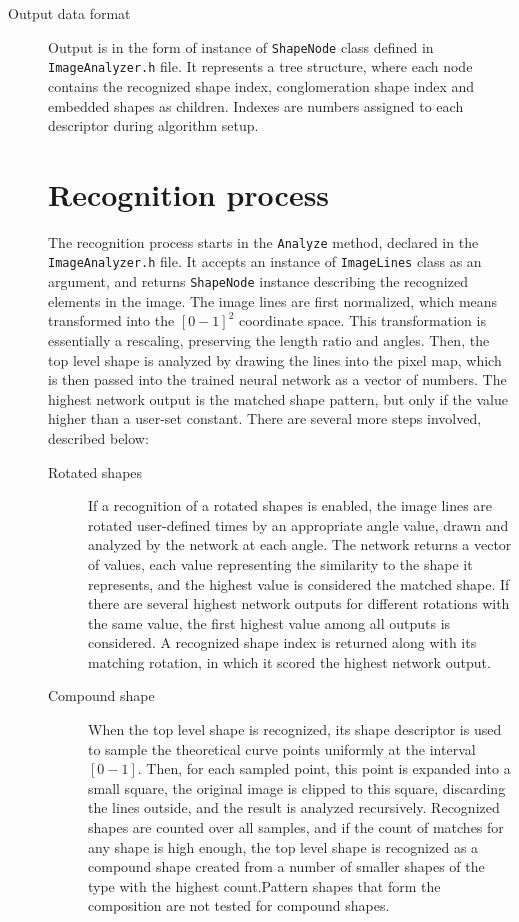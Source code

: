 \begin{description}
\item [Output data format]
Output is in the form of instance of \texttt{ShapeNode} class defined in \texttt{ImageAnalyzer.h} file. It represents a tree structure, where each node contains the recognized shape index, conglomeration shape index and embedded shapes as children. Indexes are numbers assigned to each descriptor during algorithm setup.


\section{Recognition process}
The recognition process starts in the \texttt{Analyze} method, declared in the \texttt{ImageAnalyzer.h} file. It accepts an instance of \texttt{ImageLines} class as an argument, and returns \texttt{ShapeNode} instance describing the recognized elements in the image. The image lines are first normalized, which means transformed into the $[0-1]^2$ coordinate space. This transformation is essentially a rescaling, preserving the length ratio and angles. Then, the top level shape is analyzed by drawing the lines into the pixel map, which is then passed into the trained neural network as a vector of numbers. The highest network output is the matched shape pattern, but only if the value higher than a user-set constant. There are several more steps involved, described below:

\begin{description}
\item [Rotated shapes] If a recognition of a rotated shapes is enabled, the image lines are rotated user-defined times by an appropriate angle value, drawn and analyzed by the network at each angle. The network returns a vector of values, each value representing the similarity to the shape it represents, and the highest value is considered the matched shape. If there are several highest network outputs for different rotations with the same value, the first highest value among all outputs is considered. A recognized shape index is returned along with its matching rotation, in which it scored the highest network output.

\item[Compound shape]
When the top level shape is recognized, its shape descriptor is used to sample the theoretical curve points uniformly at the interval $[0-1]$. Then, for each sampled point, this point is expanded into a small square, the original image is clipped to this square, discarding the lines outside, and the result is analyzed recursively. Recognized shapes are counted over all samples, and if the count of matches for any shape is high enough, the top level shape is recognized as a compound shape created from a number of smaller shapes of the type with the highest count.Pattern shapes that form the composition are not tested for compound shapes.


\end{description}
\end{description}

